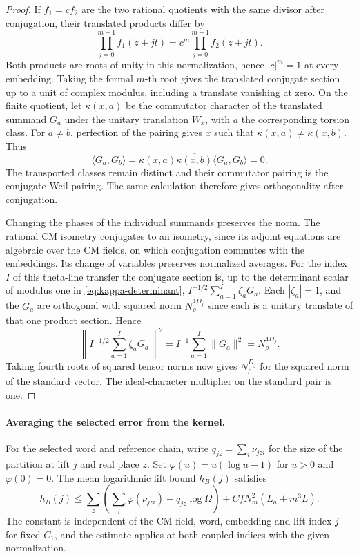 \begin{proof}
If \(f_1=c f_2\) are the two rational quotients with the
same divisor after conjugation, their translated products differ by
\[
 \prod_{j=0}^{m-1} f_1(z+jt)
     =c^m\prod_{j=0}^{m-1} f_2(z+jt).
\]
Both products are roots of unity in this normalization, hence
\(|c|^m=1\) at every embedding.
Taking the formal \(m\)-th root gives the translated conjugate
section up to a unit of complex modulus, including a translate
vanishing at zero. On the finite quotient, let \(\kappa(x,a)\) be the commutator
character of the translated summand \(G_a\) under the unitary
translation \(W_x\), with \(a\) the corresponding torsion class.
For \(a\ne b\), perfection of the pairing gives \(x\) such that
\(\kappa(x,a)\ne\kappa(x,b)\). Thus
\[
 \langle G_a,G_b\rangle
  = \kappa(x,a)\overline{\kappa(x,b)}
       \langle G_a,G_b\rangle=0 .
\]
The transported classes remain distinct and their commutator
pairing is the conjugate Weil pairing. The same calculation
therefore gives orthogonality after conjugation.

Changing the
phases of the individual summands preserves the norm. The rational CM isometry conjugates to an
isometry, since its adjoint equations are algebraic over the
CM fields, on which conjugation commutes with the embeddings.
Its change of variables preserves normalized averages.
For the index \(I\) of this theta-line transfer the conjugate
section is, up to the determinant scalar of modulus one in
\eqref{eq:kappa-determinant}, \(I^{-1/2}\sum_{a=1}^I\zeta_a G_a\).
Each \(|\zeta_a|=1\), and the \(G_a\) are orthogonal with
squared norm \(N_\rho^{4D_j}\) since each is a unitary translate
of that one product section. Hence
\[
      \left\| I^{-1/2}\sum_{a=1}^I\zeta_a G_a\right\|^2
               = I^{-1}\sum_{a=1}^I\|G_a\|^2
               = N_\rho^{4D_j}.
\] Taking fourth roots of squared
tensor norms now gives \(N_\rho^{D_j}\) for the squared norm
of the standard vector. The ideal-character multiplier on the
standard pair is one.

\end{proof}

\paragraph{Averaging the selected error from the kernel.}
\begin{proposition}\label{prop:mean-reference-lift-price}
For the selected word and reference chain, write \(q_{jz}=\sum_i\nu_{jzi}\) for the size of the partition at lift \(j\) and real place \(z\). Set \(\varphi(u)=u(\log u-1)\) for \(u>0\) and \(\varphi(0)=0\). The mean logarithmic lift bound \(h_B(j)\) satisfies
\[
 h_B(j)\le
 \sum_z\left(\sum_i\varphi(\nu_{jzi})-q_{jz}\log\Omega\right)
       +C fN_m^2(L_a+m^3L).
\]
The constant is independent of the CM field, word, embedding and lift index \(j\)
for fixed \(C_1\), and the estimate applies at both coupled
indices with the given normalization.
\end{proposition}

